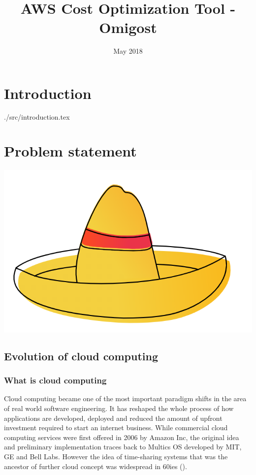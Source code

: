\documentclass[licencjacka,en]{thesisclass}
\title{AWS Cost Optimization Tool - Omigost}
\date{May 2018}
\begin{document}
\maketitle

\begin{abstract}
  
\end{abstract}

\tableofcontents

\chapter{Introduction}
{./src/introduction.tex}

\chapter{Problem statement}

\includegraphics[width=\textwidth*\real{0.4}]{imgs/sombrerro.png}

\section{Evolution of cloud computing}

\subsection{What is cloud computing}

Cloud computing became one of the most important paradigm shifts in the area of real world software engineering.
It has reshaped the whole process of how applications are developed, deployed and reduced the amount of upfront
investment required to start an internet business. While commercial cloud computing services were first offered
in 2006 by Amazon Inc, the original idea and preliminary implementation traces back to Multics OS developed by MIT,
GE and Bell Labs. However the idea of time-sharing systems that was the ancestor of further cloud
concept was widespread in 60ies (\cite{BMarkus}).
\end{document}
